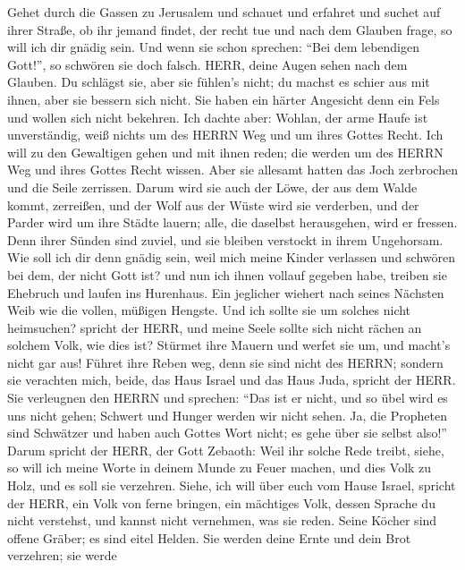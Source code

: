  Gehet durch die Gassen zu Jerusalem und schauet und
erfahret und suchet auf ihrer Straße, ob ihr jemand findet, der recht
tue und nach dem Glauben frage, so will ich dir gnädig sein.
 Und wenn sie schon sprechen: ``Bei dem lebendigen Gott!'',
so schwören sie doch falsch.  HERR, deine Augen sehen nach
dem Glauben. Du schlägst sie, aber sie fühlen's nicht; du machst es
schier aus mit ihnen, aber sie bessern sich nicht. Sie haben ein härter
Angesicht denn ein Fels und wollen sich nicht bekehren.  Ich
dachte aber: Wohlan, der arme Haufe ist unverständig, weiß nichts um des
HERRN Weg und um ihres Gottes Recht.  Ich will zu den
Gewaltigen gehen und mit ihnen reden; die werden um des HERRN Weg und
ihres Gottes Recht wissen. Aber sie allesamt hatten das Joch zerbrochen
und die Seile zerrissen.  Darum wird sie auch der Löwe, der
aus dem Walde kommt, zerreißen, und der Wolf aus der Wüste wird sie
verderben, und der Parder wird um ihre Städte lauern; alle, die daselbst
herausgehen, wird er fressen. Denn ihrer Sünden sind zuviel, und sie
bleiben verstockt in ihrem Ungehorsam.  Wie soll ich dir
denn gnädig sein, weil mich meine Kinder verlassen und schwören bei dem,
der nicht Gott ist? und nun ich ihnen vollauf gegeben habe, treiben sie
Ehebruch und laufen ins Hurenhaus.  Ein jeglicher wiehert
nach seines Nächsten Weib wie die vollen, müßigen Hengste. 
Und ich sollte sie um solches nicht heimsuchen? spricht der HERR, und
meine Seele sollte sich nicht rächen an solchem Volk, wie dies ist?
 Stürmet ihre Mauern und werfet sie um, und macht's nicht
gar aus! Führet ihre Reben weg, denn sie sind nicht des HERRN;
 sondern sie verachten mich, beide, das Haus Israel und das
Haus Juda, spricht der HERR.  Sie verleugnen den HERRN und
sprechen: ``Das ist er nicht, und so übel wird es uns nicht gehen;
Schwert und Hunger werden wir nicht sehen.  Ja, die
Propheten sind Schwätzer und haben auch Gottes Wort nicht; es gehe über
sie selbst also!''  Darum spricht der HERR, der Gott
Zebaoth: Weil ihr solche Rede treibt, siehe, so will ich meine Worte in
deinem Munde zu Feuer machen, und dies Volk zu Holz, und es soll sie
verzehren.  Siehe, ich will über euch vom Hause Israel,
spricht der HERR, ein Volk von ferne bringen, ein mächtiges Volk, dessen
Sprache du nicht verstehst, und kannst nicht vernehmen, was sie reden.
 Seine Köcher sind offene Gräber; es sind eitel Helden.
 Sie werden deine Ernte und dein Brot verzehren; sie werde
